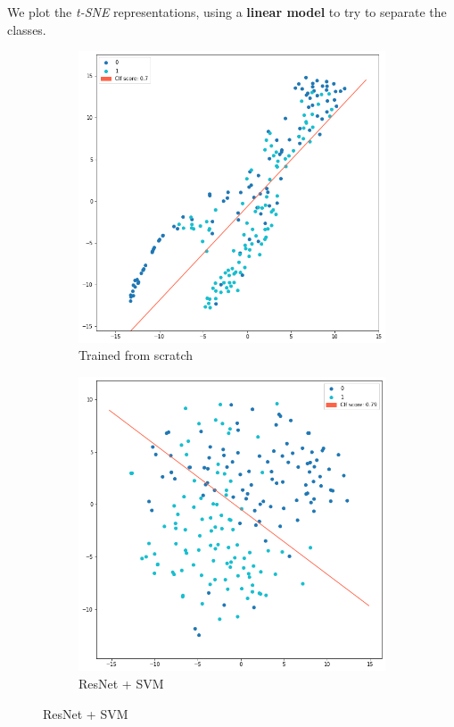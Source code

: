 \documentclass[a4paper]{article}
\begin{document}
\begin{itemize}
        We plot the \emph{t-SNE} representations, using a \textbf{linear model} to try to separate the classes.
        \begin{figure}[H]
          \centering
          \begin{subfigure}[b]{0.49\columnwidth}
            \includegraphics[width=\textwidth]{Figures/transfer-scratch.png}
            \caption{Trained from scratch}
            \label{fig:scratch}
          \end{subfigure}
          \hfill
          \begin{subfigure}[b]{0.49\columnwidth}
            \includegraphics[width=\textwidth]{Figures/transfer-svm.png}
            \caption{ResNet + SVM}
            \label{fig:svm}
          \end{subfigure}


\end{figure}
\end{itemize}
\end{document}
